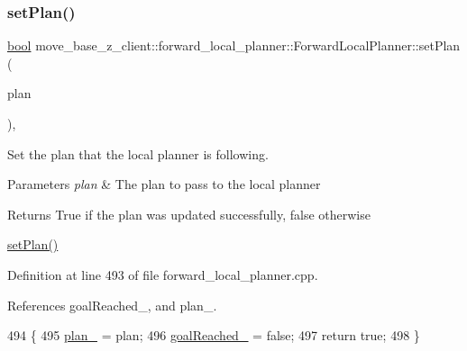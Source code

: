 \mbox{\label{classmove__base__z__client_1_1forward__local__planner_1_1ForwardLocalPlanner_a525b842cadd1e69e944907e1945a61c8}} 
\subsubsection{\texorpdfstring{set\+Plan()}{setPlan()}}
{\footnotesize\ttfamily \hyperlink{classbool}{bool} move\+\_\+base\+\_\+z\+\_\+client\+::forward\+\_\+local\+\_\+planner\+::\+Forward\+Local\+Planner\+::set\+Plan (\begin{DoxyParamCaption}\item[{const std\+::vector$<$ geometry\+\_\+msgs\+::\+Pose\+Stamped $>$ \&}]{plan }\end{DoxyParamCaption})\hspace{0.3cm}{\ttfamily [override]}, {\ttfamily [virtual]}}



Set the plan that the local planner is following. 


\begin{DoxyParams}{Parameters}
{\em plan} & The plan to pass to the local planner \\
\hline
\end{DoxyParams}
\begin{DoxyReturn}{Returns}
True if the plan was updated successfully, false otherwise
\end{DoxyReturn}
\hyperlink{classmove__base__z__client_1_1forward__local__planner_1_1ForwardLocalPlanner_a525b842cadd1e69e944907e1945a61c8}{set\+Plan()} 

Definition at line 493 of file forward\+\_\+local\+\_\+planner.\+cpp.



References goal\+Reached\+\_\+, and plan\+\_\+.


\begin{DoxyCode}
494 \{
495     \hyperlink{classmove__base__z__client_1_1forward__local__planner_1_1ForwardLocalPlanner_a1c6191c999481e31fabd41f7a04041fe}{plan\_} = plan;
496     \hyperlink{classmove__base__z__client_1_1forward__local__planner_1_1ForwardLocalPlanner_a2c86f8381cc3b8677f95f32ae6939023}{goalReached\_} = \textcolor{keyword}{false};
497     \textcolor{keywordflow}{return} \textcolor{keyword}{true};
498 \}
\end{DoxyCode}


